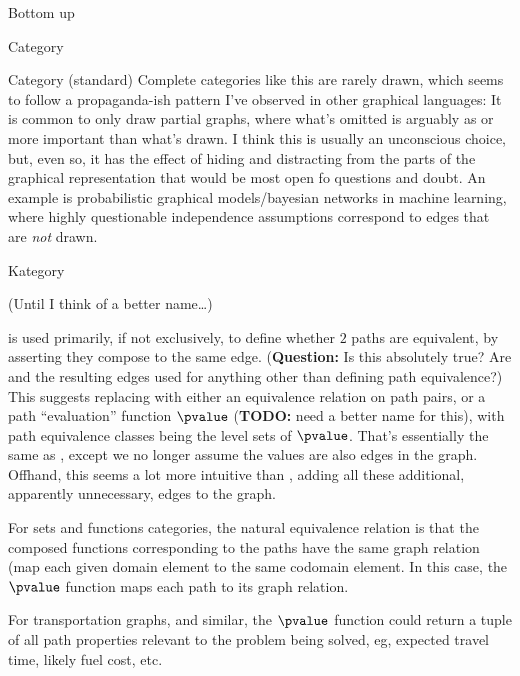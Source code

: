 \begin{plSection}{Bottom up}
\begin{plSection}{Category}
\begin{plSection}{Category (standard)}
Complete categories like this are rarely drawn,
which seems to follow a propaganda-ish pattern 
I've observed in other graphical languages:
It is common to only draw partial graphs,
where what's omitted is arguably as or more important 
than what's drawn.
I think this is usually an unconscious choice,
but, even so, it has the effect of hiding and distracting 
from the parts of the graphical representation that would
be most open fo questions and doubt.
An example is probabilistic graphical models/bayesian networks
in machine learning, where highly questionable
independence assumptions correspond to edges that 
are \textsl{not} drawn.
\end{plSection}
\begin{plSection}{Kategory}
\label{sec:Kategory_from_digraph}

(Until I think of a better name\ldots)

\compose is used primarily, if not exclusively,
to define whether $2$ paths are equivalent, by asserting they 
compose to the same edge.
(\textbf{Question:} Is this absolutely true?
Are \compose and the resulting edges
used for anything other than defining path equivalence?)
This suggests replacing \compose with 
either an equivalence relation on path pairs,
or a path ``evaluation'' function $\pvalue$
(\textbf{TODO:} need a better name for this),
with path equivalence classes
being the level sets of $\pvalue$.
That's essentially the same as \compose,
except we no longer assume the values are also edges in the graph.
Offhand, this seems a lot more intuitive than \compose,
adding all these additional, apparently unnecessary, edges to
the graph.

For sets and functions categories, the natural equivalence relation
is that the composed functions corresponding to the paths 
have the same graph relation (map each given domain element to the 
same codomain element. 
In this case, the $\pvalue$ function maps each path
to its graph relation.

For transportation graphs, and similar, the $\pvalue$ 
function could return a tuple of all path properties relevant to
the problem being solved, eg,  expected travel time, likely fuel 
cost, etc.


\end{plSection}
\end{plSection}
\end{plSection}
